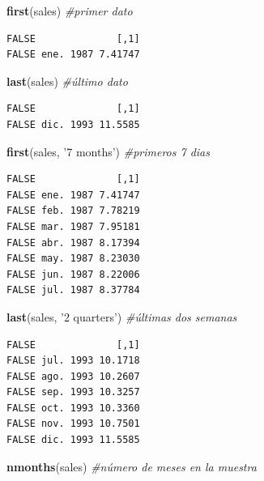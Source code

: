 \documentclass[]{book}
\newenvironment{Shaded}{\begin{snugshade}}{\end{snugshade}}
\newcommand{\CommentTok}[1]{\textcolor[rgb]{0.56,0.35,0.01}{\textit{#1}}}
\newcommand{\KeywordTok}[1]{\textcolor[rgb]{0.13,0.29,0.53}{\textbf{#1}}}
\newcommand{\NormalTok}[1]{#1}
\newcommand{\StringTok}[1]{\textcolor[rgb]{0.31,0.60,0.02}{#1}}
\begin{document}
\begin{Shaded}
\begin{Highlighting}[]
\KeywordTok{first}\NormalTok{(sales) }\CommentTok{#primer dato}
\end{Highlighting}
\end{Shaded}

\begin{verbatim}
FALSE              [,1]
FALSE ene. 1987 7.41747
\end{verbatim}

\begin{Shaded}
\begin{Highlighting}[]
\KeywordTok{last}\NormalTok{(sales) }\CommentTok{#último dato}
\end{Highlighting}
\end{Shaded}

\begin{verbatim}
FALSE              [,1]
FALSE dic. 1993 11.5585
\end{verbatim}

\begin{Shaded}
\begin{Highlighting}[]
\KeywordTok{first}\NormalTok{(sales, }\StringTok{'7 months'}\NormalTok{) }\CommentTok{#primeros 7 dias}
\end{Highlighting}
\end{Shaded}

\begin{verbatim}
FALSE              [,1]
FALSE ene. 1987 7.41747
FALSE feb. 1987 7.78219
FALSE mar. 1987 7.95181
FALSE abr. 1987 8.17394
FALSE may. 1987 8.23030
FALSE jun. 1987 8.22006
FALSE jul. 1987 8.37784
\end{verbatim}

\begin{Shaded}
\begin{Highlighting}[]
\KeywordTok{last}\NormalTok{(sales, }\StringTok{'2 quarters'}\NormalTok{) }\CommentTok{#últimas dos semanas}
\end{Highlighting}
\end{Shaded}

\begin{verbatim}
FALSE              [,1]
FALSE jul. 1993 10.1718
FALSE ago. 1993 10.2607
FALSE sep. 1993 10.3257
FALSE oct. 1993 10.3360
FALSE nov. 1993 10.7501
FALSE dic. 1993 11.5585
\end{verbatim}

\begin{Shaded}
\begin{Highlighting}[]
\KeywordTok{nmonths}\NormalTok{(sales) }\CommentTok{#número de meses en la muestra}
\end{Highlighting}
\end{Shaded}
\end{document}
